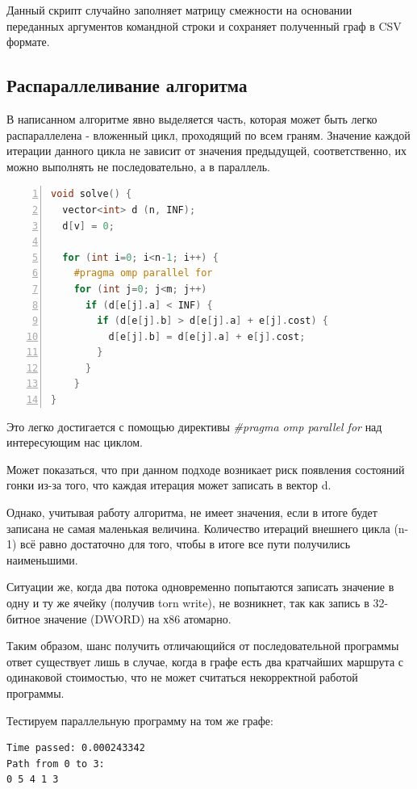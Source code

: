 \documentclass[utf8x, 14pt]{article}
\begin{document}
Данный скрипт случайно заполняет матрицу смежности на основании переданных аргументов командной строки и сохраняет полученный граф в CSV формате.

\subsection{Распараллеливание алгоритма}

В написанном алгоритме явно выделяется часть, которая может быть легко распараллелена - вложенный цикл, проходящий по всем граням. Значение каждой итерации данного цикла не зависит от значения предыдущей, соответственно, их можно выполнять не последовательно, а в параллель.

\begin{lstlisting}[language=C++, numbers=left, frame=single]
void solve() {
  vector<int> d (n, INF);
  d[v] = 0;
	
  for (int i=0; i<n-1; i++) {
	#pragma omp parallel for
	for (int j=0; j<m; j++)
	  if (d[e[j].a] < INF) {
		if (d[e[j].b] > d[e[j].a] + e[j].cost) {
		  d[e[j].b] = d[e[j].a] + e[j].cost;
		}
	  }
	}
}
\end{lstlisting}

Это легко достигается с помощью директивы \textit{\#pragma omp parallel for} над интересующим нас циклом.

Может показаться, что при данном подходе возникает риск появления состояний гонки из-за того, что каждая итерация может записать в вектор d.

Однако, учитывая работу алгоритма, не имеет значения, если в итоге будет записана не самая маленькая величина. Количество итераций внешнего цикла (n-1) всё равно достаточно для того, чтобы в итоге все пути получились наименьшими.

Ситуации же, когда два потока одновременно попытаются записать значение в одну и ту же ячейку (получив torn write), не возникнет, так как запись в 32-битное значение (DWORD) на х86 атомарно\cite{intel}.

Таким образом, шанс получить отличающийся от последовательной программы ответ существует лишь в случае, когда в графе есть два кратчайших маршрута с одинаковой стоимостью, что не может считаться некорректной работой программы.

Тестируем параллельную программу на том же графе:

\begin{lstlisting}[frame=single]
Time passed: 0.000243342
Path from 0 to 3: 
0 5 4 1 3 
\end{lstlisting}
\end{document}

